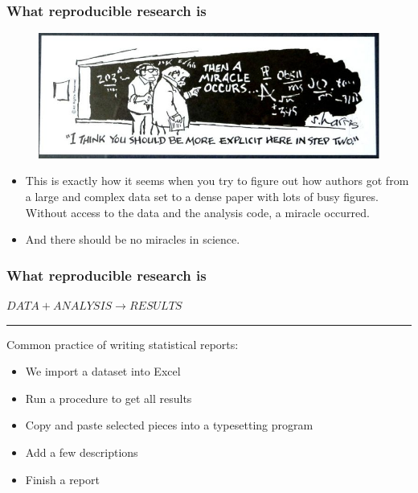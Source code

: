 \documentclass{beamer}
\begin{document}
\begin{frame}
\frametitle{What reproducible research is}
\begin{figure}
\includegraphics[scale=0.45]{figures/thenamiracleoccurs.jpg}
\end{figure}
\footnotesize
\begin{itemize}
\item This is exactly how it seems when you try to figure out how authors got from a large and complex data set to a dense paper with lots of busy figures. \\Without access to the data and the analysis code, a miracle occurred.
\item And  there should be {\sc no miracles in science.} \citep{Markowetz:2016cs}
\end{itemize}
\end{frame}


\begin{frame}
\frametitle{What reproducible research is}
\Large\centering $DATA +  ANALYSIS \rightarrow RESULTS$\\
\rule{\textwidth}{0.05pt}\vspace{20px}
Common practice of writing statistical reports: 
\small\begin{itemize}
    \item We import a dataset into Excel
    \item Run a procedure to get all results
    \item Copy and paste selected pieces into a typesetting program
    \item Add a few descriptions
    \item Finish a report
\end{itemize}

\end{frame}
\end{document}

